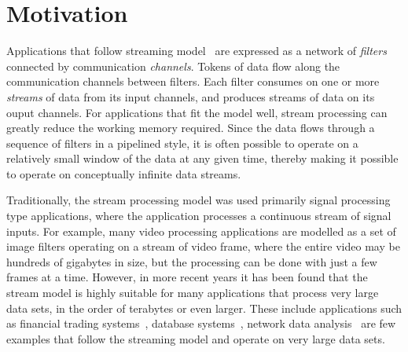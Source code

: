 \documentclass[10pt, conference, compsocconf, reqno]{IEEEtran}
\begin{document}


%
\IEEEpeerreviewmaketitle
\section{Motivation}

Applications that follow streaming model~\cite{Thies:2002:SLS:647478.727935,Halbwachs91thesynchronous,Stephens95asurvey,muthukrishnan2005data}
are expressed as a network of \textit{filters} connected by communication
\textit{channels}. Tokens of data flow along the communication channels
between filters. Each filter consumes on one or more \textit{streams}
of data from its input channels, and produces streams of data on its
ouput channels. For applications that fit the model well, stream processing
can greatly reduce the working memory required. Since the data flows through
a sequence of filters in a pipelined style, it is often possible to
operate on a relatively small window of the data at any given time,
thereby making it possible to operate on conceptually infinite
data streams.

Traditionally, the stream processing model was used primarily
signal processing type applications, where the application
processes a continuous stream of signal inputs. For example,
many video processing applications are modelled as a set of
image filters operating on a stream of video frame, where the
entire video may be hundreds of gigabytes in size, but the
processing can be done with just a few frames at a time.
However, in more recent years it has been found that the stream
model is highly suitable for many applications that process
very large data sets, in the order of terabytes or even larger.
These include applications such as financial trading
systems~\cite{agarwal2009faster},
database systems~\cite{Golab03datastream},
network data analysis~\cite{Gilbert01quicksand:quick,Sullivan:1998:TSM:1268256.1268258} are few examples that follow the streaming model and operate on very large data sets.
\end{document}
